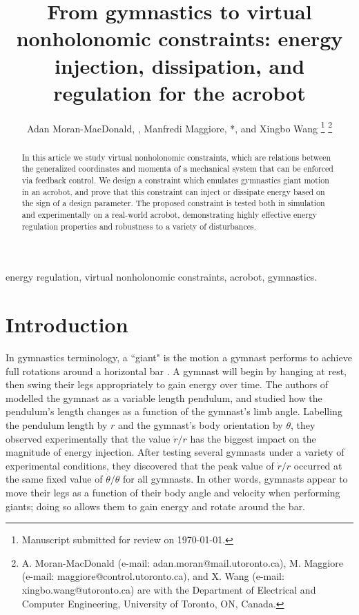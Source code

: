 \documentclass[journal,twoside,web, twocolumn,draftcls]{ieeecolor}
\newcommand*{\Title}{From gymnastics to virtual nonholonomic constraints: energy
injection, dissipation, and regulation for the acrobot}
\begin{document}
\title{\Title}
\author{Adan Moran-MacDonald, , Manfredi Maggiore,
*, and Xingbo Wang
\thanks{Manuscript submitted for review on \today.}
\thanks{A. Moran-MacDonald (e-mail: adan.moran@mail.utoronto.ca),
M. Maggiore (e-mail: maggiore@control.utoronto.ca), and
X. Wang (e-mail: xingbo.wang@utoronto.ca) are with the Department of
Electrical and Computer Engineering, University of Toronto, ON, Canada.}
} %

\maketitle

\begin{abstract}
    In this article we study virtual nonholonomic constraints, which are
    relations between the generalized coordinates and momenta of a
    mechanical system that can be enforced via feedback control.
    We design a constraint which emulates gymnastics giant motion in an
    acrobot, and prove that this constraint can inject or dissipate
    energy based on the sign of a design parameter.
    The proposed constraint is tested both in simulation and experimentally on a real-world acrobot,
    demonstrating highly effective energy regulation properties and robustness
    to a variety of disturbances.
\end{abstract}

\begin{IEEEkeywords}
    energy regulation, virtual nonholonomic constraints, acrobot, gymnastics.
\end{IEEEkeywords}

\section{Introduction}\label{sec:introduction}

In gymnastics terminology, a ``giant" is the motion a gymnast performs to
achieve full rotations around a horizontal bar \cite{usagym_giant}. 
A gymnast will begin by hanging at rest, then swing their legs
appropriately to gain energy over time.
The authors of \cite{pendulum_length_giant_gymnastics} modelled the gymnast as a
variable length pendulum, and studied how the pendulum's length changes as a
function of the gymnast's limb angle.
Labelling the pendulum length by \(r\) and the gymnast's body orientation
by \(\theta\), they observed experimentally that the value \(\dot{r}/r\) has
the biggest impact on the magnitude of energy injection. 
After testing several gymnasts under a variety of experimental conditions, 
they discovered that the peak value of \(\dot{r}/r\) occurred at the same fixed
value of \(\dot{\theta}/\theta\) for all gymnasts.
In other words, gymnasts appear to move their legs as a function of their body
angle and velocity when performing giants; 
doing so allows them to gain energy and rotate around the bar.
\end{document}
